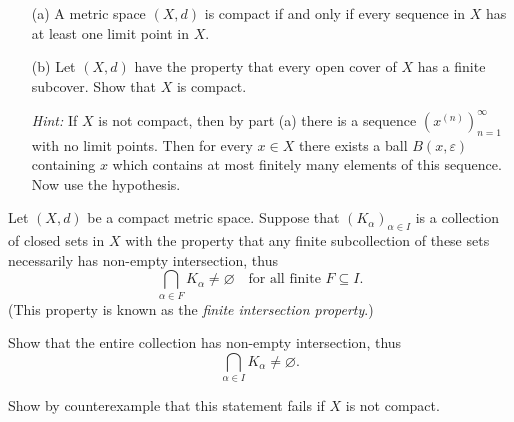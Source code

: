 \begin{problem}[16pts]
  \vphantom{text}
  \begin{enumerate}
  \item[(a)]  A metric space $(X,d)$ is compact if and only if every sequence in $X$ has at least one limit point in $X$.

  
    \item[(b)] 
Let $(X,d)$ have the property that every open cover of $X$ has a finite subcover.  
Show that $X$ is compact.  

\emph{Hint:} If $X$ is not compact, then by part (a) there is a sequence $(x^{(n)})_{n=1}^\infty$ with no limit points.  
Then for every $x \in X$ there exists a ball $B(x,\varepsilon)$ containing $x$ which contains at most finitely many elements of this sequence.  
Now use the hypothesis.
  \end{enumerate}
\end{problem}

\begin{problem}[10pts]
  Let $(X,d)$ be a compact metric space. Suppose that $(K_\alpha)_{\alpha \in I}$ is a collection of closed sets in $X$ with the property that any finite subcollection of these sets necessarily has non-empty intersection, thus
\[
\bigcap_{\alpha \in F} K_\alpha \neq \varnothing \quad \text{for all finite } F \subseteq I.
\]
(This property is known as the \emph{finite intersection property}.)  

Show that the entire collection has non-empty intersection, thus
\[
\bigcap_{\alpha \in I} K_\alpha \neq \varnothing.
\]

Show by counterexample that this statement fails if $X$ is not compact.
 
\end{problem}

